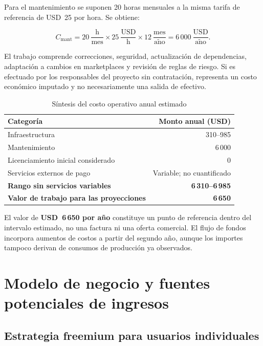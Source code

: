 Para el mantenimiento se suponen 20 horas mensuales a la misma tarifa de referencia de USD~25 por hora. Se obtiene:

\begin{equation}
C_{\mathrm{mant}} = 20\ \frac{\mathrm{h}}{\mathrm{mes}} \times 25\ \frac{\mathrm{USD}}{\mathrm{h}} \times 12\ \frac{\mathrm{mes}}{\mathrm{a\tilde{n}o}} = 6\,000\ \frac{\mathrm{USD}}{\mathrm{a\tilde{n}o}}.
\label{eq:ml-mantenimiento}
\end{equation}

El trabajo comprende correcciones, seguridad, actualización de dependencias, adaptación a cambios en marketplaces y revisión de reglas de riesgo. Si es efectuado por los responsables del proyecto sin contratación, representa un costo económico imputado y no necesariamente una salida de efectivo.

\begin{table}[htbp]
\centering
\caption{Síntesis del costo operativo anual estimado}
\label{tab:ml-operacion-anual}
\small
\begin{tabularx}{\textwidth}{@{}X r@{}}
\toprule
\textbf{Categoría} & \textbf{Monto anual (USD)} \\
\midrule
Infraestructura & 310--985 \\
Mantenimiento & 6\,000 \\
Licenciamiento inicial considerado & 0 \\
Servicios externos de pago & Variable; no cuantificado \\
\midrule
\textbf{Rango sin servicios variables} & \textbf{6\,310--6\,985} \\
\textbf{Valor de trabajo para las proyecciones} & \textbf{6\,650} \\
\bottomrule
\end{tabularx}
\end{table}

El valor de \textbf{USD~6\,650 por año} constituye un punto de referencia dentro del intervalo estimado, no una factura ni una oferta comercial. El flujo de fondos incorpora aumentos de costos a partir del segundo año, aunque los importes tampoco derivan de consumos de producción ya observados.

\section{Modelo de negocio y fuentes potenciales de ingresos}\label{sec:ml-modelo-negocio}

\subsection{Estrategia freemium para usuarios individuales}

